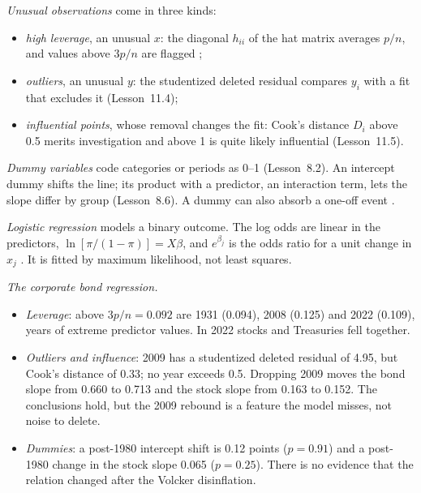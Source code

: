 \begin{qfmethod}\label{meth:regression-extensions}
 \emph{Unusual observations} come in three kinds:
\begin{itemize}
\item \emph{high leverage}, an unusual $x$: the diagonal $h_{ii}$ of the hat matrix averages $p/n$, and values above $3p/n$ are flagged \citep[Lesson~11.2]{regression-methods-course-notes};
\item \emph{outliers}, an unusual $y$: the studentized deleted residual compares $y_i$ with a fit that excludes it (Lesson~11.4);
\item \emph{influential points}, whose removal changes the fit: Cook's distance $D_i$ above 0.5 merits investigation and above 1 is quite likely influential (Lesson~11.5).
\end{itemize}

\emph{Dummy variables} code categories or periods as 0--1 (Lesson~8.2). An intercept dummy shifts the line; its product with a predictor, an interaction term, lets the slope differ by group (Lesson~8.6). A dummy can also absorb a one-off event \citep[sec.~7.4]{s7-hyndman}.

\emph{Logistic regression} models a binary outcome. The log odds are linear in the predictors, $\ln[\pi/(1-\pi)]=X\beta$, and $e^{\beta_j}$ is the odds ratio for a unit change in $x_j$ \citep[Lesson~13.2]{regression-methods-course-notes}. It is fitted by maximum likelihood, not least squares.

 \emph{The corporate bond regression.}
\begin{itemize}
\item \emph{Leverage}: above $3p/n=0.092$ are 1931 (0.094), 2008 (0.125) and 2022 (0.109), years of extreme predictor values. In 2022 stocks and Treasuries fell together.
\item \emph{Outliers and influence}: 2009 has a studentized deleted residual of 4.95, but Cook's distance of 0.33; no year exceeds 0.5. Dropping 2009 moves the bond slope from 0.660 to 0.713 and the stock slope from 0.163 to 0.152. The conclusions hold, but the 2009 rebound is a feature the model misses, not noise to delete.
\item \emph{Dummies}: a post-1980 intercept shift is 0.12 points ($p=0.91$) and a post-1980 change in the stock slope 0.065 ($p=0.25$). There is no evidence that the relation changed after the Volcker disinflation.
\end{itemize}


\end{qfmethod}
